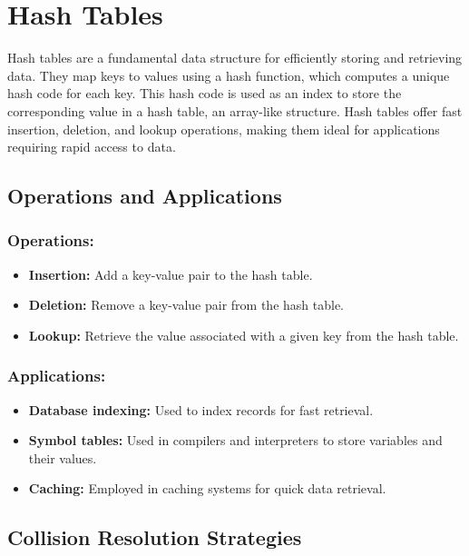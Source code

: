 \documentclass[12pt]{book} %
\begin{document}
\section{Hash Tables}

Hash tables are a fundamental data structure for efficiently storing and retrieving data. They map keys to values using a hash function, which computes a unique hash code for each key. This hash code is used as an index to store the corresponding value in a hash table, an array-like structure. Hash tables offer fast insertion, deletion, and lookup operations, making them ideal for applications requiring rapid access to data.

\subsection{Operations and Applications}

\subsubsection{Operations:}
\begin{itemize}
    \item \textbf{Insertion:} Add a key-value pair to the hash table.
    \item \textbf{Deletion:} Remove a key-value pair from the hash table.
    \item \textbf{Lookup:} Retrieve the value associated with a given key from the hash table.
\end{itemize}

\subsubsection{Applications:}
\begin{itemize}
    \item \textbf{Database indexing:} Used to index records for fast retrieval.
    \item \textbf{Symbol tables:} Used in compilers and interpreters to store variables and their values.
    \item \textbf{Caching:} Employed in caching systems for quick data retrieval.
\end{itemize}

\subsection{Collision Resolution Strategies}
\end{document}
